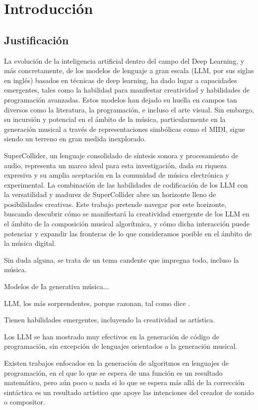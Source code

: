 \chapter{Introducción}

\section{Justificación}

La evolución de la inteligencia artificial dentro del campo del Deep Learning, y más concretamente, de los modelos de lenguaje a gran escala (LLM, por sus siglas en inglés) basados en técnicas de deep learning, ha dado lugar a capacidades emergentes, tales como la habilidad para manifestar creatividad y habilidades de programación avanzadas. Estos modelos han dejado su huella en campos tan diversos como la literatura, la programación, e incluso el arte visual. Sin embargo, su incursión y potencial en el ámbito de la música, particularmente en la generación musical a través de representaciones simbólicas como el MIDI, sigue siendo un terreno en gran medida inexplorado.

SuperCollider, un lenguaje consolidado de síntesis sonora y procesamiento de audio, representa un marco ideal para esta investigación, dada su riqueza expresiva y su amplia aceptación en la comunidad de música electrónica y experimental. La combinación de las habilidades de codificación de los LLM con la versatilidad y madurez de SuperCollider abre un horizonte lleno de posibilidades creativas. Este trabajo pretende navegar por este horizonte, buscando descubrir cómo se manifestará la creatividad emergente de los LLM en el ámbito de la composición musical algorítmica, y cómo dicha interacción puede potenciar y expandir las fronteras de lo que consideramos posible en el ámbito de la música digital.


Sin duda alguna, se trata de un tema candente que impregna todo, incluso la música.

Modelos de Ia generativa música...

LLM, los más sorprendentes, porque razonan, tal como dice \citep{chenTeachingLargeLanguage2023}.

Tienen habilidades emergentes, incluyendo la creatividad as artística.

Los LLM se han mostrado muy efectivos en la generación de código de programación, sin excepción de lenguajes orientados a la generación musical. 

Existen trabajos enfocados en la generación de algoritmos en lenguajes de programación, en el que lo que se espera de una función es un resultado matemático, pero aún poco o nada si lo que se espera más allá de la corrección sintáctica es un resultado artístico que apoye las intenciones del creador de sonido o compositor.

